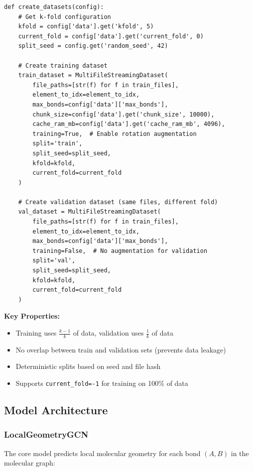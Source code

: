 \documentclass[11pt,a4paper]{article}
\begin{document}
\begin{lstlisting}[caption={K-Fold Dataset Creation (lines 105-206)}]
def create_datasets(config):
    # Get k-fold configuration
    kfold = config['data'].get('kfold', 5)
    current_fold = config['data'].get('current_fold', 0)
    split_seed = config.get('random_seed', 42)

    # Create training dataset
    train_dataset = MultiFileStreamingDataset(
        file_paths=[str(f) for f in train_files],
        element_to_idx=element_to_idx,
        max_bonds=config['data']['max_bonds'],
        chunk_size=config['data'].get('chunk_size', 10000),
        cache_ram_mb=config['data'].get('cache_ram_mb', 4096),
        training=True,  # Enable rotation augmentation
        split='train',
        split_seed=split_seed,
        kfold=kfold,
        current_fold=current_fold
    )

    # Create validation dataset (same files, different fold)
    val_dataset = MultiFileStreamingDataset(
        file_paths=[str(f) for f in train_files],
        element_to_idx=element_to_idx,
        max_bonds=config['data']['max_bonds'],
        training=False,  # No augmentation for validation
        split='val',
        split_seed=split_seed,
        kfold=kfold,
        current_fold=current_fold
    )
\end{lstlisting}

\textbf{Key Properties:}
\begin{itemize}
    \item Training uses $\frac{k-1}{k}$ of data, validation uses $\frac{1}{k}$ of data
    \item No overlap between train and validation sets (prevents data leakage)
    \item Deterministic splits based on seed and file hash
    \item Supports \texttt{current\_fold=-1} for training on 100\% of data
\end{itemize}

\subsection{Model Architecture}

\subsubsection{LocalGeometryGCN}

The core model predicts local molecular geometry for each bond $(A, B)$ in the molecular graph:
\end{document}
